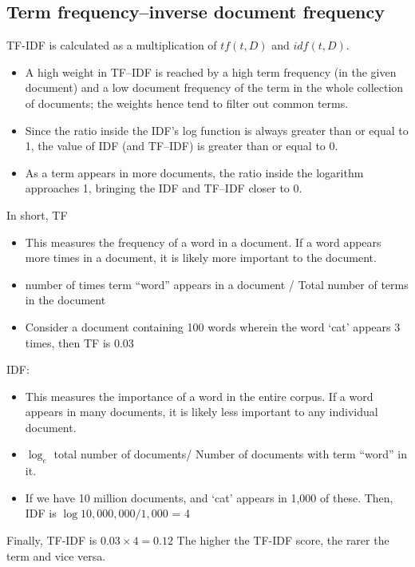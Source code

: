\subsection{Term frequency–inverse document frequency}
TF-IDF is calculated as a multiplication of $tf(t, D)$ and $idf(t, D)$. 
\begin{itemize}
	\item A high weight in TF–IDF is reached by a high term frequency (in the given document) and a low document frequency of the term in the whole collection of documents; the weights hence tend to filter out common terms. 
	\item Since the ratio inside the IDF's log function is always greater than or equal to 1, the value of IDF (and TF–IDF) is greater than or equal to 0. 
	\item As a term appears in more documents, the ratio inside the logarithm approaches 1, bringing the IDF and TF–IDF closer to 0. 
\end{itemize}


In short, TF
\begin{itemize}
	\item This measures the frequency of a word in a document. If a word appears more times in a document, it is likely more important to the document.
	\item number of times term ``word'' appears in a document / Total number of terms in the document
	\item Consider a document containing 100 words wherein the word `cat' appears 3 times, then TF is 0.03
\end{itemize}

IDF: 
\begin{itemize}
	\item This measures the importance of a word in the entire corpus. If a word appears in many documents, it is likely less important to any individual document. 
	\item $\log_e$ total number of documents/ Number of documents with term ``word'' in it. 
	\item If we have 10 million documents, and `cat' appears in 1,000 of these. Then, IDF is $\log 10,000,000/1,000$  = 4
\end{itemize}

Finally, TF-IDF is $0.03\times 4 = 0.12$ 
The higher the TF-IDF score, the rarer the term and vice versa. 



